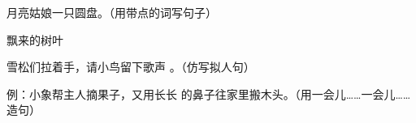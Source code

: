 \documentclass[a4paper, answer, zihao = -4, unicodeGBMath, fontset=sourcesans, %
]{ctexart}
\begin{document}
  \begin{qus}
  \item 月亮姑娘一只圆盘。（用带点的词写句子）

    飘来的树叶

  \item 雪松们拉着手，请小鸟留下歌声 。（仿写拟人句）


  \item 例：小象帮主人摘果子，又用长长
    的鼻子往家里搬木头。（用一会儿……一会儿……造句）

    \oneline{} %

    \oneline{}

  \end{qus}

\end{document}

